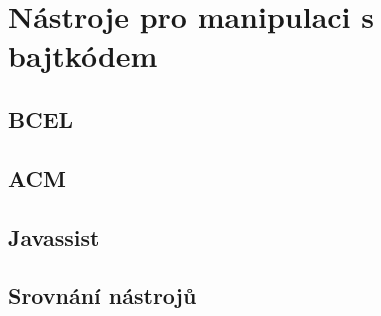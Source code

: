 \chapter{Nástroje pro manipulaci s bajtkódem}


\section{BCEL}


\section{ACM}



\section{Javassist}


\section{Srovnání nástrojů}


